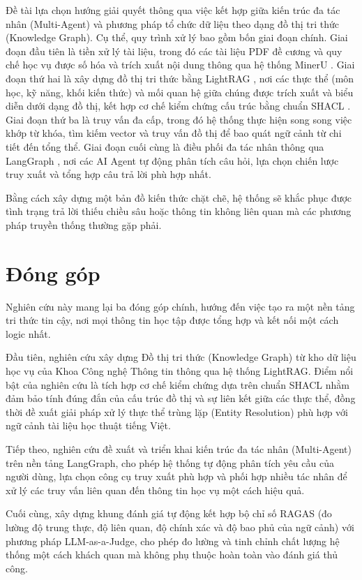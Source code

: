 Đề tài lựa chọn hướng giải quyết thông qua việc kết hợp giữa kiến trúc đa tác nhân (Multi-Agent) và phương pháp tổ chức dữ liệu theo dạng đồ thị tri thức (Knowledge Graph). Cụ thể, quy trình xử lý bao gồm bốn giai đoạn chính. Giai đoạn đầu tiên là tiền xử lý tài liệu, trong đó các tài liệu PDF đề cương và quy chế học vụ được số hóa và trích xuất nội dung thông qua hệ thống MinerU \cite{mineru_2024}. Giai đoạn thứ hai là xây dựng đồ thị tri thức bằng LightRAG \cite{guo2025lightrag}, nơi các thực thể (môn học, kỹ năng, khối kiến thức) và mối quan hệ giữa chúng được trích xuất và biểu diễn dưới dạng đồ thị, kết hợp cơ chế kiểm chứng cấu trúc bằng chuẩn SHACL \cite{shacl_w3c}. Giai đoạn thứ ba là truy vấn đa cấp, trong đó hệ thống thực hiện song song việc khớp từ khóa, tìm kiếm vector và truy vấn đồ thị để bao quát ngữ cảnh từ chi tiết đến tổng thể. Giai đoạn cuối cùng là điều phối đa tác nhân thông qua LangGraph \cite{langgraph2024}, nơi các AI Agent tự động phân tích câu hỏi, lựa chọn chiến lược truy xuất và tổng hợp câu trả lời phù hợp nhất.

Bằng cách xây dựng một bản đồ kiến thức chặt chẽ, hệ thống sẽ khắc phục được tình trạng trả lời thiếu chiều sâu hoặc thông tin không liên quan mà các phương pháp truyền thống thường gặp phải.

\section{Đóng góp}

Nghiên cứu này mang lại ba đóng góp chính, hướng đến việc tạo ra một nền tảng tri thức tin cậy, nơi mọi thông tin học tập được tổng hợp và kết nối một cách logic nhất.

Đầu tiên, nghiên cứu xây dựng Đồ thị tri thức (Knowledge Graph) từ kho dữ liệu học vụ của Khoa Công nghệ Thông tin thông qua hệ thống LightRAG. Điểm nổi bật của nghiên cứu là tích hợp cơ chế kiểm chứng dựa trên chuẩn SHACL nhằm đảm bảo tính đúng đắn của cấu trúc đồ thị và sự liên kết giữa các thực thể, đồng thời đề xuất giải pháp xử lý thực thể trùng lặp (Entity Resolution) phù hợp với ngữ cảnh tài liệu học thuật tiếng Việt.

Tiếp theo, nghiên cứu đề xuất và triển khai kiến trúc đa tác nhân (Multi-Agent) trên nền tảng LangGraph, cho phép hệ thống tự động phân tích yêu cầu của người dùng, lựa chọn công cụ truy xuất phù hợp và phối hợp nhiều tác nhân để xử lý các truy vấn liên quan đến thông tin học vụ một cách hiệu quả.

Cuối cùng, xây dựng khung đánh giá tự động kết hợp bộ chỉ số RAGAS (đo lường độ trung thực, độ liên quan, độ chính xác và độ bao phủ của ngữ cảnh) với phương pháp LLM-as-a-Judge, cho phép đo lường và tinh chỉnh chất lượng hệ thống một cách khách quan mà không phụ thuộc hoàn toàn vào đánh giá thủ công.

